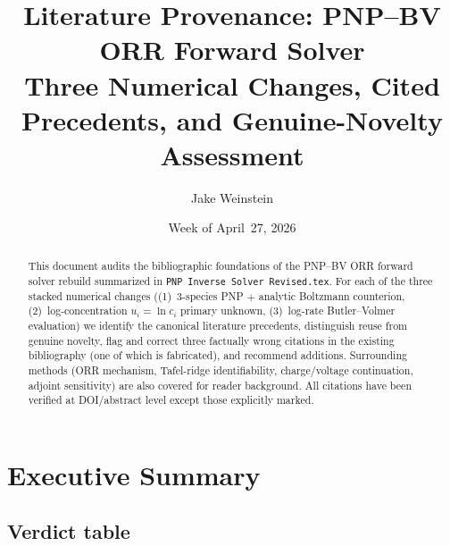 \documentclass[11pt]{article}
\title{Literature Provenance: PNP--BV ORR Forward Solver\\
       Three Numerical Changes, Cited Precedents, and Genuine-Novelty Assessment}
\author{Jake Weinstein}
\date{Week of April~27, 2026}
\begin{document}
\maketitle

\begin{abstract}
This document audits the bibliographic foundations of the PNP--BV ORR forward
solver rebuild summarized in \texttt{PNP Inverse Solver Revised.tex}. For each
of the three stacked numerical changes ((1)~3-species PNP $+$ analytic
Boltzmann counterion, (2)~log-concentration $u_i=\ln c_i$ primary unknown,
(3)~log-rate Butler--Volmer evaluation) we identify the canonical literature
precedents, distinguish reuse from genuine novelty, flag and correct three
factually wrong citations in the existing bibliography (one of which is
fabricated), and recommend additions. Surrounding methods (ORR mechanism,
Tafel-ridge identifiability, charge/voltage continuation, adjoint sensitivity)
are also covered for reader background. All citations have been verified at
DOI/abstract level except those explicitly marked.
\end{abstract}

\section{Executive Summary}

\subsection*{Verdict table}
\end{document}
